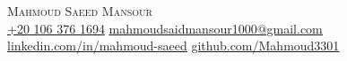 \begin{center}
    {\huge \scshape Mahmoud Saeed Mansour} \\[2pt]
    \footnotesize
    \href{https://wa.me/201063761694}{ +20 106 376 1694} \quad
    \href{mailto:mahmoudsaidmansour1000@gmail.com}{ \underline{mahmoudsaidmansour1000@gmail.com}} \quad
    \href{https://www.linkedin.com/in/mahmoud-saeed-928623252}{ \underline{linkedin.com/in/mahmoud-saeed}} \quad
    \href{https://github.com/Mahmoud3301}{ \underline{github.com/Mahmoud3301}}
\end{center}\vspace{-8pt}
